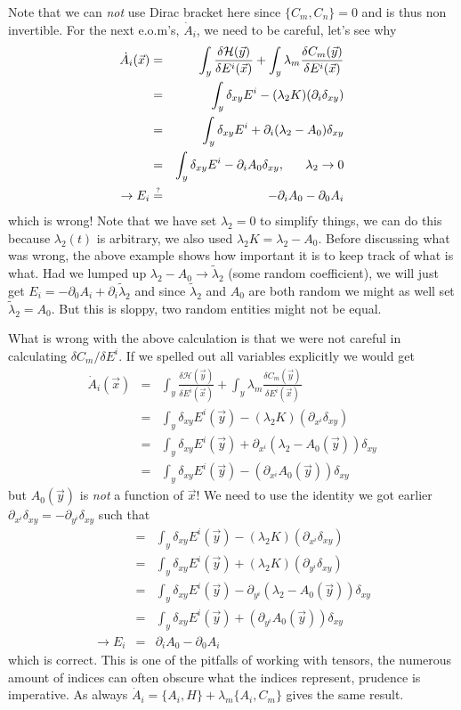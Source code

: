 \documentclass[aps,preprint,preprintnumbers,nofootinbib,showpacs,prd]{revtex4-1}
\newcommand{\nbea}{\begin{eqnarray*}}
\newcommand{\neea}{\end{eqnarray*}}
\begin{document}
Note that we can {\it not} use Dirac bracket here since $\{C_m, C_n\} = 0$ and is thus non invertible. For the next e.o.m's, $\dot A_i$, we need to be careful, let's see why
%
\nbea
\dot A_i(\vec x) & = & \int_y \frac{\delta \mathcal{H}(\vec y)}{\delta E^i(\vec x)} + \int_y \lambda_m \frac{\delta C_m(\vec y)}{\delta E^i(\vec x)} \\
& = & \int_y \delta_{xy} E^i - (\lambda_2 K) (\partial_i \delta_{xy})\\
& = & \int_y \delta_{xy} E^i + \partial_i (\lambda_2 - A_0) \delta_{xy}\\
& = & \int_y \delta_{xy} E^i - \partial_i A_0 \delta_{xy}, ~~~~~ \lambda_2 \to 0 \\
\to E_i & \stackrel{\text{\tiny ?}}{=} & -\partial_i A_0 - \partial_0 A_i
\neea
%
which is wrong! Note that we have set $\lambda_2 = 0$ to simplify things, we can do this because $\lambda_2(t)$ is arbitrary, we also used $\lambda_2 K = \lambda_2 - A_0$. Before discussing what was wrong, the above example shows how important it is to keep track of what is what. Had we lumped up $\lambda_2 - A_0 \to \tilde \lambda_2$ (some random coefficient), we will just get $E_i = -\partial_0 A_i + \partial_i \tilde \lambda_2$ and since $\tilde \lambda_2$ and $A_0$ are both random we might as well set $\tilde \lambda_2 = A_0$. But this is sloppy, two random entities might not be equal.

What is wrong with the above calculation is that we were not careful in calculating $\delta C_m/\delta E^i$. If we spelled out all variables explicitly we would get
%
\nbea
\dot A_i(\vec x) & = & \int_y \frac{\delta \mathcal{H}(\vec y)}{\delta E^i(\vec x)} + \int_y \lambda_m \frac{\delta C_m(\vec y)}{\delta E^i(\vec x)} \\
& = & \int_y \delta_{xy} E^i(\vec y) - (\lambda_2 K) (\partial_{x^i} \delta_{xy})\\
& = & \int_y \delta_{xy} E^i(\vec y) + \partial_{x^i} (\lambda_2 - A_0(\vec y)) \delta_{xy}\\
& = & \int_y \delta_{xy} E^i(\vec y) - (\partial_{x^i} A_0(\vec y)) \delta_{xy}
\neea
%
but $A_0(\vec y)$ is {\it not} a function of $\vec x$! We need to use the identity we got earlier $\partial_{x^i} \delta_{xy} = -\partial_{y^i} \delta_{xy}$ such that
%
\nbea
& = & \int_y \delta_{xy} E^i(\vec y) - (\lambda_2 K) (\partial_{x^i} \delta_{xy})\\
& = & \int_y \delta_{xy} E^i(\vec y) + (\lambda_2 K) (\partial_{y^i} \delta_{xy})\\
& = & \int_y \delta_{xy} E^i(\vec y) - \partial_{y^i} (\lambda_2 - A_0(\vec y)) \delta_{xy}\\
& = & \int_y \delta_{xy} E^i(\vec y) + (\partial_{y^i} A_0(\vec y)) \delta_{xy} \\
\to E_i & = & \partial_i A_0 - \partial_0 A_i
\neea
%
which is correct. This is one of the pitfalls of working with tensors, the numerous amount of indices can often obscure what the indices represent, prudence is imperative. As always $\dot A_i = \{A_i, H\} + \lambda_m \{A_i, C_m\}$ gives the same result.
\end{document}
